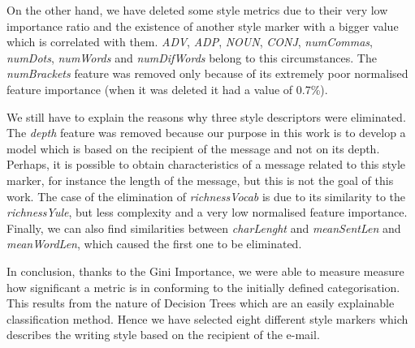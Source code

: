 On the other hand, we have deleted some style metrics due to their very low importance ratio and the existence of another style marker with a bigger value which is correlated with them. \textit{ADV}, \textit{ADP}, \textit{NOUN}, \textit{CONJ}, \textit{numCommas}, \textit{numDots}, \textit{numWords} and \textit{numDifWords} belong to this circumstances. The \textit{numBrackets} feature was removed only because of its extremely poor normalised feature importance (when it was deleted it had a value of 0.7\%).

We still have to explain the reasons why three style descriptors were eliminated. The \textit{depth} feature was removed because our purpose in this work is to develop a model which is based on the recipient of the message and not on its depth. Perhaps, it is possible to obtain characteristics of a message related to this style marker, for instance the length of the message, but this is not the goal of this work. The case of the elimination of \textit{richnessVocab} is due to its similarity to the \textit{richnessYule}, but less complexity and a very low normalised feature importance. Finally, we can also find similarities between \textit{charLenght} and \textit{meanSentLen} and \textit{meanWordLen}, which caused the first one to be eliminated.

In conclusion, thanks to the Gini Importance, we were able to measure measure how significant a metric is in conforming to the initially defined categorisation. This results from the nature of Decision Trees which are an easily explainable classification method. Hence we have selected eight different style markers which describes the writing style based on the recipient of the e-mail.